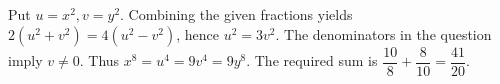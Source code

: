 Put $u=x^2,v=y^2$. Combining the given fractions yields $2(u^2+v^2)=4(u^2-v^2)$, hence $u^2=3v^2$. The denominators in the question imply $v\ne 0$. Thus $x^8=u^4=9v^4=9y^8$. The required sum is $\dfrac{10}{8}+\dfrac{8}{10}=\boxed{\dfrac{41}{20}}$.
